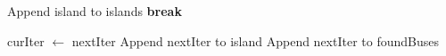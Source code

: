 \documentclass[12pt]{article}
\newcommand\blankpage{%
    \null
    \thispagestyle{empty}%
    \addtocounter{page}{-1}%
    \newpage}
\begin{document}
\begin{algorithm}
\begin{algorithmic}[1]
                    \EndFor
    
                        \State Append island to islands
                        \State \textbf{break}
                    \EndIf
    
                    \State curIter $\gets$ nextIter
                    \State Append nextIter to island
                    \State Append nextIter to foundBuses
    
                \EndWhile
            \EndIf
        \EndFor
    \EndFunction
    \end{algorithmic}
\end{algorithm}
\afterpage{\blankpage}
\end{document}
